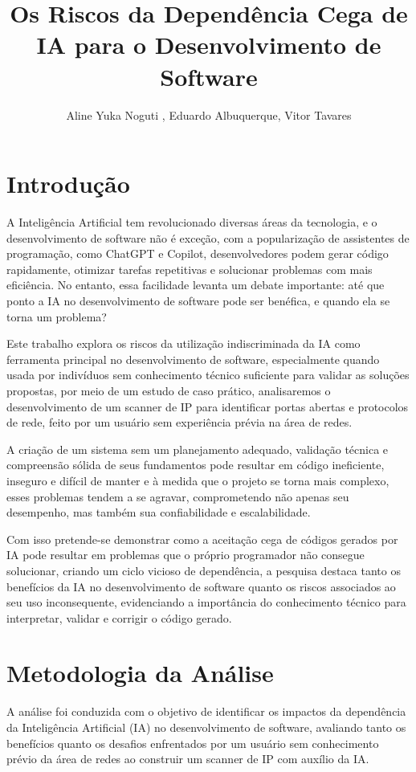 \documentclass[12pt]{article}
\title{Os Riscos da Dependência Cega de IA para o Desenvolvimento de Software}
\author{Aline Yuka Noguti \inst{1}, Eduardo Albuquerque\inst{1}, Vitor Tavares\inst{1}}
\begin{document}
\maketitle

\section{Introdução}

A Inteligência Artificial tem revolucionado diversas áreas da tecnologia, e o desenvolvimento de software não é exceção, com a popularização de assistentes de programação, como ChatGPT e Copilot, desenvolvedores podem gerar código rapidamente, otimizar tarefas repetitivas e solucionar problemas com mais eficiência. No entanto, essa facilidade levanta um debate importante: até que ponto a IA no desenvolvimento de software pode ser benéfica, e quando ela se torna um problema?

Este trabalho explora os riscos da utilização indiscriminada da IA como ferramenta principal no desenvolvimento de software, especialmente quando usada por indivíduos sem conhecimento técnico suficiente para validar as soluções propostas, por meio de um estudo de caso prático, analisaremos o desenvolvimento de um scanner de IP para identificar portas abertas e protocolos de rede, feito por um usuário sem experiência prévia na área de redes.

A criação de um sistema sem um planejamento adequado, validação técnica e compreensão sólida de seus fundamentos pode resultar em código ineficiente, inseguro e difícil de manter e à medida que o projeto se torna mais complexo, esses problemas tendem a se agravar, comprometendo não apenas seu desempenho, mas também sua confiabilidade e escalabilidade.

Com isso pretende-se demonstrar como a aceitação cega de códigos gerados por IA pode resultar em problemas que o próprio programador não consegue solucionar, criando um ciclo vicioso de dependência, a pesquisa destaca tanto os benefícios da IA no desenvolvimento de software quanto os riscos associados ao seu uso inconsequente, evidenciando a importância do conhecimento técnico para interpretar, validar e corrigir o código gerado.

\section{Metodologia da Análise}

A análise foi conduzida com o objetivo de identificar os impactos da dependência da Inteligência Artificial (IA) no desenvolvimento de software, avaliando tanto os benefícios quanto os desafios enfrentados por um usuário sem conhecimento prévio da área de redes ao construir um scanner de IP com auxílio da IA.
\end{document}

